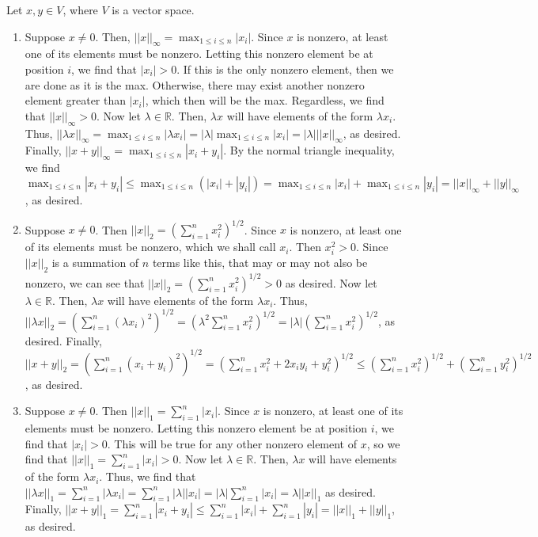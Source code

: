 \documentclass{article}
\def\R{\mathbb{R}}
\begin{document}
Let $x,y \in V$, where $V$ is a vector space. 
\begin{enumerate}
\item Suppose $x \neq 0$. Then, $||x||_{\infty} = \displaystyle\max_{1\leq i \leq n} |x_i|$. Since $x$ is nonzero, at least one of its elements must be nonzero. Letting this nonzero element be at position $i$, we find that $|x_i| > 0$. If this is the only nonzero element, then we are done as it is the max. Otherwise, there may exist another nonzero element greater than $|x_i|$, which then will be the max. Regardless, we find that $||x||_{\infty} > 0$. Now let $\lambda \in \R$. Then, $\lambda x$ will have elements of the form $\lambda x_i$. Thus, $||\lambda x||_{\infty} = \displaystyle\max_{1 \leq i \leq n} |\lambda x_i| = |\lambda|\displaystyle\max_{1 \leq i \leq n} |x_i| = |\lambda|||x||_{\infty}$, as desired. Finally, $||x + y||_{\infty} = \displaystyle\max_{1 \leq i \leq n} |x_i + y_i|$. By the normal triangle inequality, we find $\displaystyle\max_{1 \leq i \leq n} |x_i + y_i| \leq \displaystyle\max_{1 \leq i \leq n} (|x_i| + |y_i|) = \displaystyle\max_{1 \leq i \leq n}|x_i| + \displaystyle\max_{1 \leq i \leq n}|y_i| = ||x||_{\infty} + ||y||_{\infty}$, as desired. 
\item Suppose $x \neq 0$. Then $||x||_2 = \left(\displaystyle\sum_{i=1}^n x_i^2 \right)^{1/2}$. Since $x$ is nonzero, at least one of its elements must be nonzero, which we shall call $x_i$. Then $x_i^2 > 0$. Since $||x||_2$ is a summation of $n$ terms like this, that may or may not also be nonzero, we can see that $||x||_2 = \left(\displaystyle\sum_{i=1}^n x_i^2 \right)^{1/2} > 0$ as desired. Now let $\lambda \in \R$. Then, $\lambda x$ will have elements of the form $\lambda x_i$. Thus, $||\lambda x||_2 = \left(\displaystyle\sum_{i=1}^n (\lambda x_i)^2 \right)^{1/2} = \left(\lambda^2\displaystyle\sum_{i=1}^n x_i^2 \right)^{1/2} = |\lambda|\left(\displaystyle\sum_{i=1}^n x_i^2 \right)^{1/2}$, as desired. Finally, $||x + y||_2 = \left(\displaystyle\sum_{i=1}^n (x_i+ y_i)^2 \right)^{1/2} = \left(\displaystyle\sum_{i=1}^n x_i^2 + 2x_iy_i + y_i^2 \right)^{1/2} \leq \left(\displaystyle\sum_{i=1}^n x_i^2 \right)^{1/2} + \left(\displaystyle\sum_{i=1}^n y_i^2 \right)^{1/2}$, as desired. 
\item Suppose $x \neq 0$. Then $||x||_1 = \displaystyle\sum_{i=1}^n |x_i|$. Since $x$ is nonzero, at least one of its elements must be nonzero. Letting this nonzero element be at position $i$, we find that $|x_i| > 0$. This will be true for any other nonzero element of $x$, so we find that $||x||_1 = \displaystyle\sum_{i=1}^n |x_i| > 0$. Now let $\lambda \in \R$. Then, $\lambda x$ will have elements of the form $\lambda x_i$. Thus, we find that $||\lambda x||_1 = \displaystyle\sum_{i=1}^n |\lambda x_i| = \displaystyle\sum_{i=1}^n |\lambda||x_i| = |\lambda|\displaystyle\sum_{i=1}^n |x_i| = \lambda||x||_1$ as desired. Finally, $||x + y||_1 = \displaystyle\sum_{i=1}^n |x_i + y_i| \leq \displaystyle\sum_{i=1}^n |x_i| + \displaystyle\sum_{i=1}^n |y_i| = ||x||_1 + ||y||_1$, as desired. 
\end{enumerate}
\end{document}
